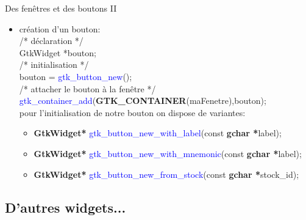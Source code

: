 \documentclass{beamer}
\begin{document}
\begin{frame}{Des fenêtres et des boutons II}
    \begin{itemize}
        \item création d'un bouton:\\
        \hspace{0.5cm}\textcolor{brun}{/* déclaration */}\\
        \hspace{0.5cm}GtkWidget *bouton;\\
        \hspace{0.5cm}\textcolor{brun}{/* initialisation */}\\
        \hspace{0.5cm}bouton = \textcolor{blue}{gtk\_button\_new}();\\
        \hspace{0.5cm}\textcolor{brun}{/* attacher le bouton à la fenêtre */}\\
        \hspace{0.5cm}\textcolor{blue}{gtk\_container\_add}(\textbf{GTK\_CONTAINER}(maFenetre),bouton);\\
        \vspace{0.3cm}
        pour l'initialisation de notre bouton on dispose de variantes:\\
        \begin{itemize}
            \item \textbf{GtkWidget*} \textcolor{blue}{gtk\_button\_new\_with\_label}(const \textbf{gchar *}label);
            \item \textbf{GtkWidget*} \textcolor{blue}{gtk\_button\_new\_with\_mnemonic}(const \textbf{gchar *}label);
            \item \textbf{GtkWidget*} \textcolor{blue}{gtk\_button\_new\_from\_stock}(const \textbf{gchar *}stock\_id);
        \end{itemize}
    \end{itemize}
\end{frame}

\subsection{D'autres widgets...}
\end{document}
